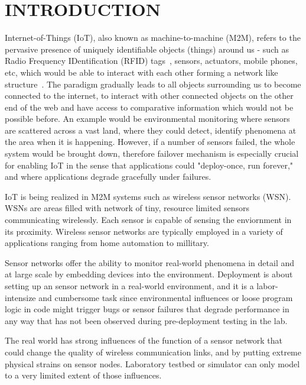 \cleardoublepage
\singlespacing
\chapter{INTRODUCTION}
\label{c:intro}
\doublespacing\nointerlineskip

Internet-of-Things (IoT), also known as machine-to-machine (M2M), refers to the
pervasive presence of uniquely identifiable objects (things) around us - such as
Radio Frequency IDentification (RFID) tags~\cite{Shepard2005}, sensors,
actuators, mobile phones, etc, which would be able to interact with each
other forming a network like structure~\cite{Atzori20102787}. 
The paradigm gradually leads to all objects surrounding us to become connected
to the internet, to interact with other connected objects on the other end of
the web and have access to comparative information which would not be possible
before.
An example would be environmental monitoring where sensors are scattered across
a vast land, where they could detect, identify phenomena at the area when it is
happening. However, if a number of sensors failed, the whole system would be
brought down, therefore failover mechanism is especially crucial for enabling
IoT in the sense that applications could "deploy-once, run forever," and where
applications degrade gracefully under failures.

IoT is being realized in M2M systems such as wireless sensor networks (WSN).
WSNs are areas filled with network of tiny, resource limited sensors
communicating wirelessly. Each sensor is capable of sensing the enviornment in
its proximity. Wireless sensor networks are typically employed in a variety of
applications ranging from home automation to millitary.

Sensor networks offer the ability to monitor real-world phenomena in detail and
at large scale by embedding devices into the environment. Deployment is
about setting up an sensor network in a real-world environment, and it is
a labor-intensize and cumbersome task since environmental influences or
loose program logic in code might trigger bugs or sensor failures that
degrade performance in any way that has not been observed during pre-deployment
testing in the lab.

The real world has strong influences of the function of a sensor network that
could change the quality of wireless communication links, and by putting
extreme physical strains on sensor nodes. Laboratory testbed or simulator can 
only model to a very limited extent of those influences.

